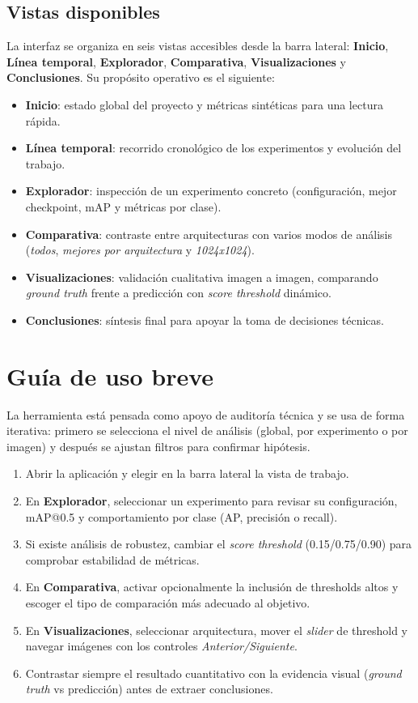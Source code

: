 \subsection{Vistas disponibles}

La interfaz se organiza en seis vistas accesibles desde la barra lateral: \textbf{Inicio}, \textbf{Línea temporal}, \textbf{Explorador}, \textbf{Comparativa}, \textbf{Visualizaciones} y \textbf{Conclusiones}. Su propósito operativo es el siguiente:
\begin{itemize}
    \item \textbf{Inicio}: estado global del proyecto y métricas sintéticas para una lectura rápida.
    \item \textbf{Línea temporal}: recorrido cronológico de los experimentos y evolución del trabajo.
    \item \textbf{Explorador}: inspección de un experimento concreto (configuración, mejor checkpoint, mAP y métricas por clase).
    \item \textbf{Comparativa}: contraste entre arquitecturas con varios modos de análisis (\textit{todos}, \textit{mejores por arquitectura} y \textit{1024x1024}).
    \item \textbf{Visualizaciones}: validación cualitativa imagen a imagen, comparando \textit{ground truth} frente a predicción con \textit{score threshold} dinámico.
    \item \textbf{Conclusiones}: síntesis final para apoyar la toma de decisiones técnicas.
\end{itemize}

\section{Guía de uso breve}
\label{sec:anexo_guia_breve}

La herramienta está pensada como apoyo de auditoría técnica y se usa de forma iterativa: primero se selecciona el nivel de análisis (global, por experimento o por imagen) y después se ajustan filtros para confirmar hipótesis.

\begin{enumerate}
    \item Abrir la aplicación y elegir en la barra lateral la vista de trabajo.
    \item En \textbf{Explorador}, seleccionar un experimento para revisar su configuración, mAP@0.5 y comportamiento por clase (AP, precisión o recall).
    \item Si existe análisis de robustez, cambiar el \textit{score threshold} (0.15/0.75/0.90) para comprobar estabilidad de métricas.
    \item En \textbf{Comparativa}, activar opcionalmente la inclusión de thresholds altos y escoger el tipo de comparación más adecuado al objetivo.
    \item En \textbf{Visualizaciones}, seleccionar arquitectura, mover el \textit{slider} de threshold y navegar imágenes con los controles \textit{Anterior/Siguiente}.
    \item Contrastar siempre el resultado cuantitativo con la evidencia visual (\textit{ground truth} vs predicción) antes de extraer conclusiones.
\end{enumerate}

